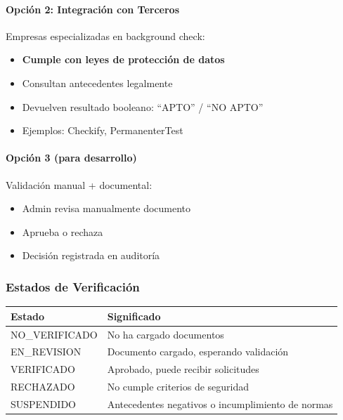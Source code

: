 \documentclass[12pt,a4paper,spanish]{article}
\begin{document}
\paragraph{Opción 2: Integración con Terceros}

Empresas especializadas en background check:
\begin{itemize}
    \item \textbf{Cumple con leyes de protección de datos}
    \item Consultan antecedentes legalmente
    \item Devuelven resultado booleano: ``APTO'' / ``NO APTO''
    \item Ejemplos: Checkify, PermanenterTest
\end{itemize}

\paragraph{Opción 3 (para desarrollo)}

Validación manual + documental:
\begin{itemize}
    \item Admin revisa manualmente documento
    \item Aprueba o rechaza
    \item Decisión registrada en auditoría
\end{itemize}

\subsubsection{Estados de Verificación}

\begin{center}
\begin{tabular}{|l|p{6cm}|}
    \toprule
    \textbf{Estado} & \textbf{Significado} \\
    \midrule
    NO\_VERIFICADO & No ha cargado documentos \\
    EN\_REVISION & Documento cargado, esperando validación \\
    VERIFICADO & Aprobado, puede recibir solicitudes \\
    RECHAZADO & No cumple criterios de seguridad \\
    SUSPENDIDO & Antecedentes negativos o incumplimiento de normas \\
    \bottomrule
\end{tabular}
\end{center}
\end{document}
